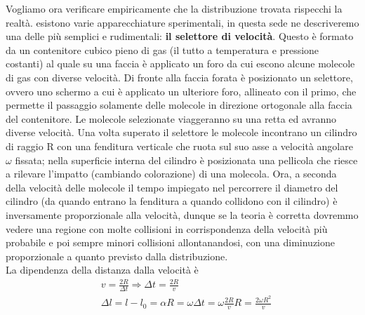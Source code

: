 \documentclass[10pt,a4paper]{article}
\begin{document}
Vogliamo ora verificare empiricamente che la distribuzione trovata rispecchi la realtà. esistono varie apparecchiature sperimentali, in questa sede ne descriveremo una delle più semplici e rudimentali: \textbf{il selettore di velocità}. Questo è formato da un contenitore cubico pieno di gas (il tutto a temperatura e pressione costanti) al quale su una faccia è applicato un foro da cui escono alcune molecole di gas con diverse velocità. Di fronte alla faccia forata è posizionato un selettore, ovvero uno schermo a cui è applicato un ulteriore foro, allineato con il primo, che permette il passaggio solamente delle molecole in direzione ortogonale alla faccia del contenitore. Le molecole selezionate viaggeranno su una retta ed avranno diverse velocità. Una volta superato il selettore le molecole incontrano un cilindro di raggio R con una fenditura verticale che ruota sul suo asse a velocità angolare $\omega$ fissata; nella superficie interna del cilindro è posizionata una pellicola che riesce a rilevare l'impatto (cambiando colorazione) di una molecola. Ora, a seconda della velocità delle molecole il tempo impiegato nel percorrere il diametro del cilindro (da quando entrano la fenditura a quando collidono con il cilindro) è inversamente proporzionale alla velocità, dunque se la teoria è corretta dovremmo vedere una regione con molte collisioni in corrispondenza della velocità più probabile e poi sempre minori collisioni allontanandosi, con una diminuzione proporzionale a quanto previsto dalla distribuzione.\\
La dipendenza della distanza dalla velocità è
\begin{align*} 
	&v = \frac{2R}{\Delta t} \Rightarrow \Delta t = \frac{2R}{v}\\
	&\Delta l = l-l_0 = \alpha R = \omega \Delta t=\omega \frac{2R}{v}R = \frac{2 \omega R^2}{v} 
\end{align*} 
\end{document}
